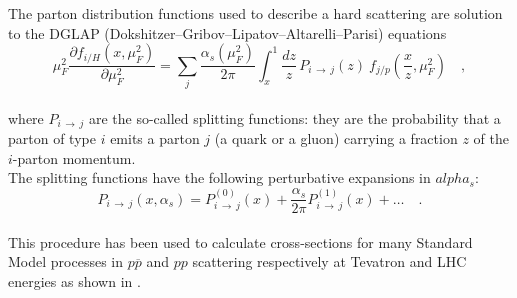 The parton distribution functions used to describe a hard scattering are solution to the DGLAP (Dokshitzer–Gribov–Lipatov–Altarelli–Parisi) equations \cite{Lipatov:400357, Gribov:427157, ALTARELLI1977298, Dokshitzer:1977sg}
\\
\begin{equation}
	\mu_F^2\frac{\partial f_{i/H}(x,\mu_F^2)}{\partial\mu_F^2}=\displaystyle\sum_j\frac{\alpha_s(\mu_F^2)}{2\pi}\displaystyle\int_x^1 \frac{dz}{z}\, P_{i\,\rightarrow\,j}(z)\ f_{j/p}\left(\frac{x}{z},\mu_F^2\right)\quad ,
\end{equation}
\\
where $P_{i\,\rightarrow\,j}$ are the so-called splitting functions: they are the probability that a parton of type $i$ emits a parton $j$ (a quark or a gluon) carrying a fraction $z$ of the $i$-parton momentum.
\\
The splitting functions have the following perturbative expansions in $alpha_s$: 
\begin{equation}
	P_{i\,\rightarrow\,j}(x,\alpha_s)=P_{i\,\rightarrow\,j}^{(0)}(x)+\frac{\alpha_s}{2\pi}P_{i\,\rightarrow\,j}^{(1)}(x)+\dots\quad .
\end{equation}
\\
This procedure has been used to calculate cross-sections for many Standard Model processes in $p\overline{p}$ and $pp$ scattering respectively at Tevatron and LHC energies as shown in .

